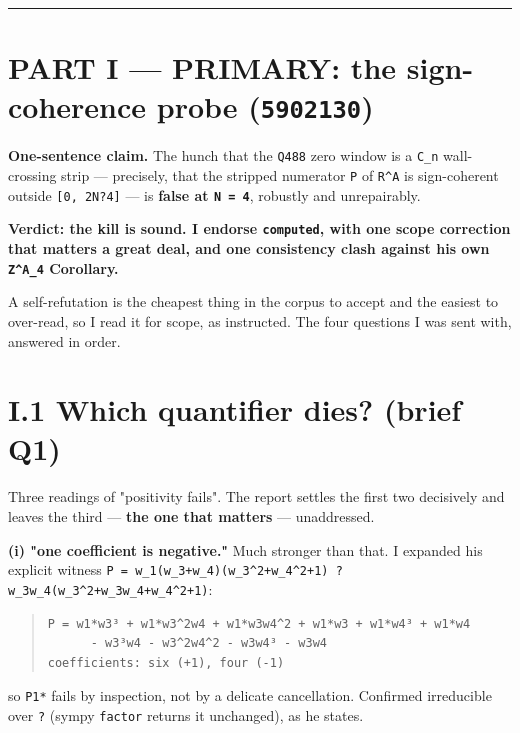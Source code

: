 \documentclass[11pt,a4paper]{article}
\begin{document}
\medskip\hrule\medskip

\section*{PART I --- PRIMARY: the sign-coherence probe (\mbox{\texttt{5902130}})}

\textbf{One-sentence claim.} The hunch that the \mbox{\texttt{Q488}} zero window is a \mbox{\texttt{C\_n}} wall-crossing strip --- precisely, that the stripped numerator \mbox{\texttt{P}} of \mbox{\texttt{R\textasciicircum{}A}} is sign-coherent outside \mbox{\texttt{[0, 2N?4]}} --- is \textbf{false at \mbox{\texttt{N = 4}}}, robustly and unrepairably.

\textbf{Verdict: the kill is sound. I endorse \mbox{\texttt{computed}}, with one scope correction that matters a great deal, and one consistency clash against his own \mbox{\texttt{Z\textasciicircum{}A\_4}} Corollary.}

A self-refutation is the cheapest thing in the corpus to accept and the easiest to over-read, so I read it for scope, as instructed. The four questions I was sent with, answered in order.

\section*{I.1 Which quantifier dies? (brief Q1)}

Three readings of "positivity fails". The report settles the first two decisively and leaves the third --- \textbf{the one that matters} --- unaddressed.

\textbf{(i) "one coefficient is negative."} Much stronger than that. I expanded his explicit witness \mbox{\texttt{P = w\_1(w\_3+w\_4)(w\_3\textasciicircum{}2+w\_4\textasciicircum{}2+1) ? w\_3w\_4(w\_3\textasciicircum{}2+w\_3w\_4+w\_4\textasciicircum{}2+1)}}:

\begin{quote}\footnotesize\begin{verbatim}
P = w1*w3³ + w1*w3^2w4 + w1*w3w4^2 + w1*w3 + w1*w4³ + w1*w4
      - w3³w4 - w3^2w4^2 - w3w4³ - w3w4
coefficients: six (+1), four (-1)
\end{verbatim}\end{quote}

so \mbox{\texttt{P1*}} fails by inspection, not by a delicate cancellation. Confirmed irreducible over \mbox{\texttt{?}} (sympy \mbox{\texttt{factor}} returns it unchanged), as he states.
\end{document}
